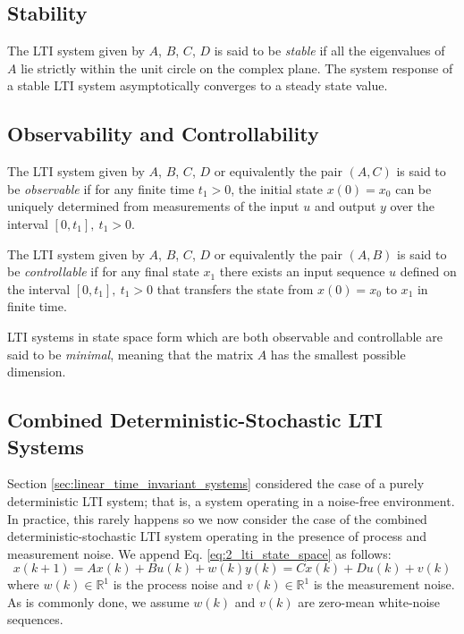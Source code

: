 \subsection{Stability}
The LTI system given by $A$, $B$, $C$, $D$ is said to be \textit{stable} if all the eigenvalues of $A$ lie strictly within the unit circle on the complex plane. The system response of a stable LTI system asymptotically converges to a steady state value.

\subsection{Observability and Controllability}
The LTI system given by $A$, $B$, $C$, $D$ or equivalently the pair $(A,C)$ is said to be \textit{observable} if for any finite time $t_1 > 0$, the initial state $x(0) = x_0$ can be uniquely determined from measurements of the input $u$ and output $y$ over the interval $[0, t_1], \ t_1>0$.

The LTI system given by $A$, $B$, $C$, $D$ or equivalently the pair $(A,B)$ is said to be \textit{controllable} if for any final state $x_1$ there exists an input sequence $u$ defined on the interval $[0, t_1], \ t_1>0$ that transfers the state from $x(0) = x_0$ to $x_1$ in finite time.

LTI systems in state space form which are both observable and controllable are said to be \textit{minimal}, meaning that the matrix $A$ has the smallest possible dimension.

\subsection{Combined Deterministic-Stochastic LTI Systems}
Section \ref{sec:linear_time_invariant_systems} considered the case of a purely deterministic LTI system; that is, a system operating in a noise-free environment. In practice, this rarely happens so we now consider the case of the combined deterministic-stochastic LTI system operating in the presence of process and measurement noise. We append Eq. \ref{eq:2_lti_state_space} as follows:
\begin{subequations}\label{eq:2_lti_noise}
\begin{equation}x(k+1) = Ax(k) + Bu(k) + w(k)\end{equation}
\begin{equation}y(k) = Cx(k) + Du(k) + v(k)\end{equation}
\end{subequations}
where $w(k)\in\mathbb{R}^1$ is the process noise and $v(k)\in\mathbb{R}^1$ is the measurement noise. As is commonly done, we assume $w(k)$ and $v(k)$ are zero-mean white-noise sequences. 

